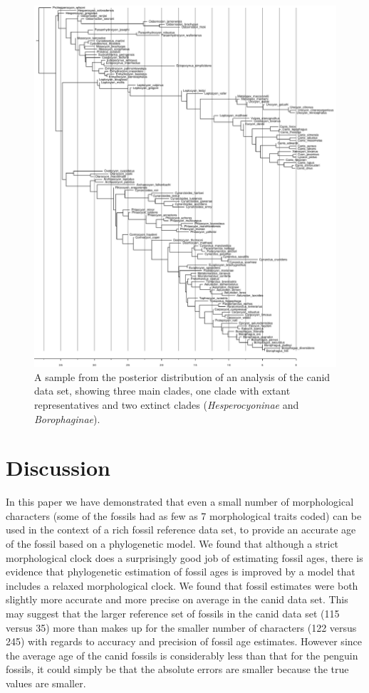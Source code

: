 \documentclass[11pt]{article}
\begin{document}
\begin{figure}
\includegraphics[width=15cm]{canids/stratRanges/1_canids_ranges_3_subset-1460502871266-tree10001.pdf}
\caption{\label{fig:canidTree} A sample from the posterior distribution of an analysis of the canid data set, 
showing three main clades, one clade with extant representatives and two extinct clades ({\it Hesperocyoninae} and {\it Borophaginae}).}
\end{figure}

\section*{Discussion}

In this paper we have demonstrated that even a small number of morphological characters (some of the fossils had as few as 7 morphological traits coded) can be used in the context of a rich fossil reference data set, to provide an accurate age of the fossil based on a phylogenetic model. 
We found that although a strict morphological clock does a surprisingly good job of estimating fossil ages, there is evidence that phylogenetic estimation of fossil ages is improved by a model that includes a relaxed morphological clock. 
We found that fossil estimates were both slightly more accurate and more precise on average in the canid data set. 
This may suggest that the larger reference set of fossils in the canid data set (115 versus 35) more than makes up for the smaller number of characters (122 versus 245) with regards to accuracy and precision of fossil age estimates. However since the average age of the canid fossils is considerably less than that for the penguin fossils, it could simply be that the absolute errors are smaller because the true values are smaller.
\end{document}

